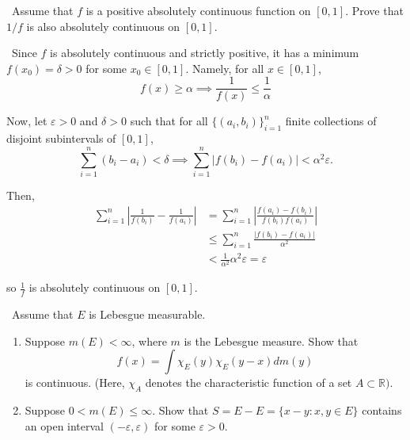 \documentclass[12pt]{Qual}
\begin{document}
\begin{problem} $\,$
Assume that $f$ is a positive absolutely continuous function on $[0,1]$. Prove that $1/f$ is also absolutely continuous on $[0,1]$.
\end{problem}


\begin{solution}$\,$
Since $f$ is absolutely continuous and strictly positive, it has a minimum $f(x_0)=\delta>0$ for some $x_0\in[0,1].$ Namely, for all $x\in[0,1]$, $$f(x)\ge\alpha\implies \frac{1}{f(x)}\le \frac{1}{\alpha}$$

Now, let $\varepsilon>0$ and $\delta>0$ such that for all $\{(a_i,b_i)\}_{i=1}^n$ finite collections of disjoint subintervals of $[0,1]$, $$\sum_{i=1}^n(b_i-a_i)<\delta\implies \sum_{i=1}^n|f(b_i)-f(a_i)|<\alpha^2\varepsilon.$$

Then, \begin{align*}
    \sum_{i=1}^n\left|\frac{1}{f(b_i)}-\frac{1}{f(a_i)}\right|&=\sum_{i=1}^n\left|\frac{f(a_i)-f(b_i)}{f(b_i)f(a_i)}\right|\\
    &\le\sum_{i=1}^n\frac{|f(b_i)-f(a_i)|}{\alpha^2}\\
    &<\frac{1}{\alpha^2}\alpha^2\varepsilon=\varepsilon
\end{align*}

so $\frac{1}{f}$ is absolutely continuous on $[0,1].$
\end{solution}
\newpage




\begin{problem} $\,$
Assume that $E$ is Lebesgue measurable.
\begin{enumerate}[label=(\alph*)]
    \item Suppose $m(E)<\infty$, where $m$ is the Lebesgue measure. Show that $$f(x)=\int\chi_E(y)\chi_E(y-x)dm(y)$$ is continuous. (Here, $\chi_A$ denotes the characteristic function of a set $A\subset\mathbb{R})$.
    \item Suppose $0<m(E)\le\infty$. Show that $S=E-E=\{x-y:x,y\in E\}$ contains an open interval $(-\varepsilon,\varepsilon)$ for some $\varepsilon>0$.
\end{enumerate}
\end{problem}
\end{document}
